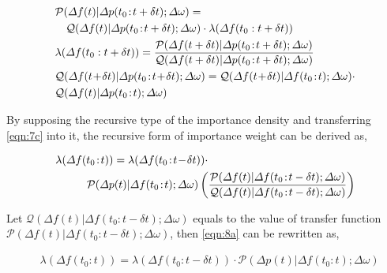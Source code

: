 \documentclass[lettersize,journal]{IEEEtran}
\begin{document}
\begin{newsubequations}\label{eqn:7} 
	\begin{align}
		& \mathcal{P}(\varDelta f(t)|\varDelta p(t_0\!:\!t+\delta t);\varDelta \omega)=\label{eqn:7a} \\
		& \quad \mathcal{Q}(\varDelta f(t)|\varDelta p(t_0\!:\!t+\delta t);\varDelta \omega) \cdot \lambda (\varDelta f(t_0:t+\delta t))\notag \\
		& \lambda (\varDelta f(t_0:t+\delta t)) = \frac{\mathcal{P} (\varDelta f(t+\delta t) | \varDelta p(t_0\!:\!t+\delta t);\varDelta \omega)}{\mathcal{Q} (\varDelta f(t+\delta t) | \varDelta p(t_0\!:\!t+\delta t);\varDelta \omega)}\label{eqn:7b} \\
		& \mathcal{Q} (\varDelta f(t\!+\!\delta t) | \varDelta p(t_0\!:\!t\!+\!\delta t);\varDelta \omega) = \mathcal{Q}(\varDelta f(t\!+\!\delta t)|\varDelta f(t_0\!:\!t); \varDelta \omega)\cdot \notag \\
		& \mathcal{Q}(\varDelta f(t)|\varDelta p(t_0\!:\!t);\varDelta \omega)  \label{eqn:7c}
	\end{align}
\end{newsubequations}

By supposing the recursive type of the importance density and transferring \eqref{eqn:7c} into it, the recursive form of importance weight can be derived as,

\vspace{-0.125in} 
\begin{newsubequations} 
	\begin{align} 
		& \lambda(\varDelta f(t_0\!:\!t)) = \lambda(\varDelta f(t_0\!:\!t\!-\!\delta t))\cdot \label{eqn:8a} \\
		& \qquad\,\,\,\,\, \mathcal{P}(\varDelta p(t)|\varDelta f(t_0\!:\!t);\varDelta \omega)\left(\frac{\mathcal{P}(\varDelta f(t)|\varDelta f(t_0\!:\!t-\delta t);\varDelta \omega)}{\mathcal{Q}(\varDelta f(t)|\varDelta f(t_0\!:\!t-\delta t);\varDelta \omega)}\right) \notag
\end{align} \end{newsubequations}

Let \(\mathcal{Q}(\varDelta f(t)|\varDelta f(t_0\!:\!t-\delta t);\varDelta \omega)\) equals to the value of transfer function \(\mathcal{P}(\varDelta f(t)|\varDelta f(t_0\!:\!t-\delta t);\varDelta \omega)\), then \eqref{eqn:8a} can be rewritten as,
\vspace{-0.125in} 

\begin{newsubequations} 
	\begin{align}
		     & \lambda(\varDelta f(t_0\!:\!t)) = \lambda(\varDelta f(t_0\!:\!t\!-\!\delta t))\cdot \mathcal{P}(\varDelta p(t)|\varDelta f(t_0\!:\!t);\varDelta \omega)\label{eqn:9a}
		\end{align} 
\end{newsubequations}
\end{document}
